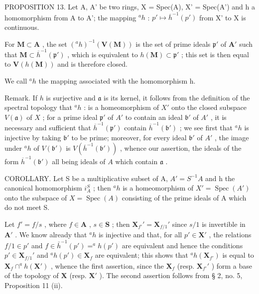 PROPOSITION 13. Let A, A' be two rings, X = Spec(A), X' = Spec(A') and h a homomorphism from A to A'; the mapping \(^a h\) : \(p' \mapsto \overline{h}^{-1}(p')\) from X' to X is continuous.

For \(\mathbf{M} \subset \mathbf{A}\) , the set \((^a h)^{-1}(\mathbf{V}(\mathbf{M}))\) is the set of prime ideals \(\mathfrak{p}'\) of \(\mathbf{A}'\) such that \(\mathbf{M} \subset \overline{h}^{-1}(\mathfrak{p}')\) , which is equivalent to \(h(\mathbf{M}) \subset \mathfrak{p}'\) ; this set is then equal to \(\mathbf{V}(h(\mathbf{M}))\) and is therefore closed.

We call \(^{a}h\) the mapping associated with the homomorphism h.

Remark. If \(h\) is surjective and \(\mathfrak{a}\) is its kernel, it follows from the definition of the spectral topology that \(^a h\) : is a homeomorphism of \(X'\) onto the closed subspace \(V(\mathfrak{a})\) of \(X\) ; for a prime ideal \(\mathfrak{p}'\) of \(A'\) to contain an ideal \(\mathfrak{b}'\) of \(A'\) , it is necessary and sufficient that \(\overline{h}^{-1}(\mathfrak{p}')\) contain \(\overline{h}^{-1}(\mathfrak{b}')\) ; we see first that \(^a h\) is injective by taking \(\mathfrak{b}'\) to be prime; moreover, for every ideal \(\mathfrak{b}'\) of \(A'\) , the image under \(^a h\) of \(V(\mathfrak{b}')\) is \(V(\overline{h}^{-1}(\mathfrak{b}'))\) , whence our assertion, the ideals of the form \(\overline{h}^{-1}(\mathfrak{b}')\) all being ideals of \(A\) which contain \(\mathfrak{a}\) .

COROLLARY. Let S be a multiplicative subset of A, \(A' = S^{-1}A\) and h the canonical homomorphism \(i_{A}^{S}\) ; then \(^{a}h\) is a homeomorphism of \(X' = \operatorname{Spec}(A')\) onto the subspace of \(X = \operatorname{Spec}(A)\) consisting of the prime ideals of A which do not meet S.

Let \(f' = f / s\) , where \(f \in \mathbf{A}\) , \(s \in \mathbf{S}\) ; then \(\mathbf{X}_{f'}' = \mathbf{X}_{f/1}'\) since \(s / 1\) is invertible in \(\mathbf{A}'\) . We know already that \(^a h\) is injective and that, for all \(p' \in \mathbf{X}'\) , the relations \(f / 1 \in p'\) and \(f \in \bar{h}^{-1}(p') = ^a h(p')\) are equivalent and hence the conditions \(p' \in \mathbf{X}_{f/1}'\) and \(^a h(p') \in \mathbf{X}_f\) are equivalent; this shows that \(^a h(\mathbf{X}_{f'})\) is equal to \(\mathbf{X}_f \cap ^a h(\mathbf{X}')\) , whence the first assertion, since the \(\mathbf{X}_f\) (resp. \(\mathbf{X}_{f'}'\) ) form a base of the topology of \(\mathbf{X}\) (resp. \(\mathbf{X}'\) ). The second assertion follows from § 2, no. 5, Proposition 11 (ii).

